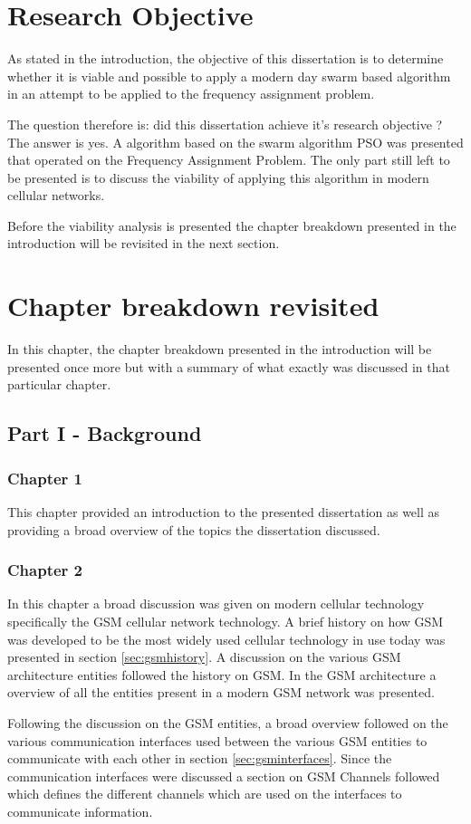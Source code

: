 \section{Research Objective}
As stated in the introduction, the objective of this dissertation is to determine whether it is viable and possible to apply a modern day swarm based algorithm in an attempt to be applied to the frequency assignment problem. 

The question therefore is: did this dissertation achieve it's research objective ? The answer is yes. A algorithm based on the swarm algorithm PSO was presented that operated on the Frequency Assignment Problem. The only part still left to be presented is to discuss the viability of applying this algorithm in modern cellular networks.

Before the viability analysis is presented the chapter breakdown presented in the introduction will be revisited in the next section.

\section{Chapter breakdown revisited}
In this chapter, the chapter breakdown presented in the introduction will be presented once more but with a summary of what exactly was discussed in that particular chapter.
\subsection{Part I - Background}
\subsubsection{Chapter 1}
This chapter provided an introduction to the presented dissertation as well as providing a broad overview of the topics the dissertation discussed. 
\subsubsection{Chapter 2}
In this chapter a broad discussion was given on modern cellular technology specifically the GSM cellular network technology. A brief history on how GSM was developed to be the most widely used cellular technology in use today was presented in section \ref{sec:gsmhistory}. A discussion on the various GSM architecture entities followed the history on GSM. In the GSM architecture a overview of all the entities present in a modern GSM network was presented.

Following the discussion on the GSM entities, a broad overview followed on the various communication interfaces used between the various GSM entities to communicate with each other in section \ref{sec:gsminterfaces}. Since the communication interfaces were discussed a section on GSM Channels followed which defines the different channels which are used on the interfaces to communicate information.

